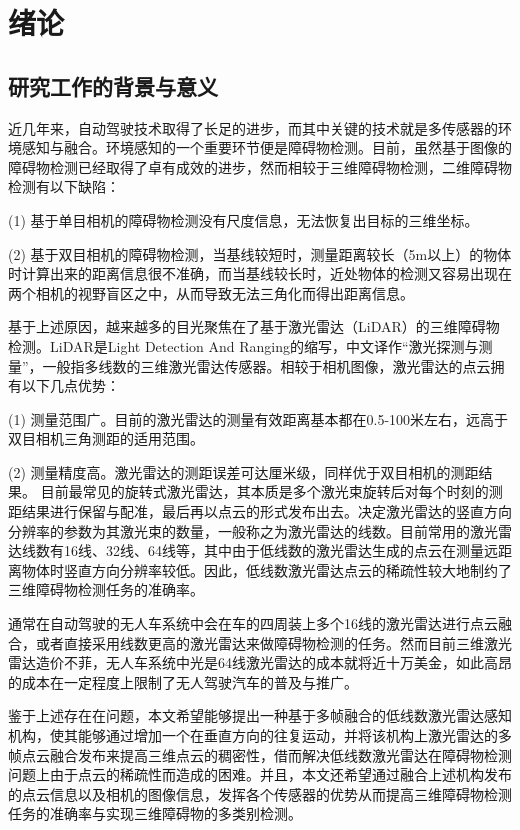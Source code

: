 
\chapter{绪论}
\section{研究工作的背景与意义}
近几年来，自动驾驶技术取得了长足的进步，而其中关键的技术就是多传感器的环境感知与融合。环境感知的一个重要环节便是障碍物检测。目前，虽然基于图像的障碍物检测已经取得了卓有成效的进步，然而相较于三维障碍物检测，二维障碍物检测有以下缺陷：

(1) 基于单目相机的障碍物检测没有尺度信息，无法恢复出目标的三维坐标。

(2) 基于双目相机的障碍物检测，当基线较短时，测量距离较长（5m以上）的物体时计算出来的距离信息很不准确，而当基线较长时，近处物体的检测又容易出现在两个相机的视野盲区之中，从而导致无法三角化而得出距离信息。

基于上述原因，越来越多的目光聚焦在了基于激光雷达（LiDAR）的三维障碍物检测。LiDAR是Light Detection And Ranging的缩写，中文译作“激光探测与测量”，一般指多线数的三维激光雷达传感器。相较于相机图像，激光雷达的点云拥有以下几点优势：

(1) 测量范围广。目前的激光雷达的测量有效距离基本都在0.5-100米左右，远高于双目相机三角测距的适用范围。

(2) 测量精度高。激光雷达的测距误差可达厘米级，同样优于双目相机的测距结果。
目前最常见的旋转式激光雷达，其本质是多个激光束旋转后对每个时刻的测距结果进行保留与配准，最后再以点云的形式发布出去。决定激光雷达的竖直方向分辨率的参数为其激光束的数量，一般称之为激光雷达的线数。目前常用的激光雷达线数有16线、32线、64线等，其中由于低线数的激光雷达生成的点云在测量远距离物体时竖直方向分辨率较低。因此，低线数激光雷达点云的稀疏性较大地制约了三维障碍物检测任务的准确率。

通常在自动驾驶的无人车系统中会在车的四周装上多个16线的激光雷达进行点云融合，或者直接采用线数更高的激光雷达来做障碍物检测的任务。然而目前三维激光雷达造价不菲，无人车系统中光是64线激光雷达的成本就将近十万美金，如此高昂的成本在一定程度上限制了无人驾驶汽车的普及与推广。

鉴于上述存在在问题，本文希望能够提出一种基于多帧融合的低线数激光雷达感知机构，使其能够通过增加一个在垂直方向的往复运动，并将该机构上激光雷达的多帧点云融合发布来提高三维点云的稠密性，借而解决低线数激光雷达在障碍物检测问题上由于点云的稀疏性而造成的困难。并且，本文还希望通过融合上述机构发布的点云信息以及相机的图像信息，发挥各个传感器的优势从而提高三维障碍物检测任务的准确率与实现三维障碍物的多类别检测。

